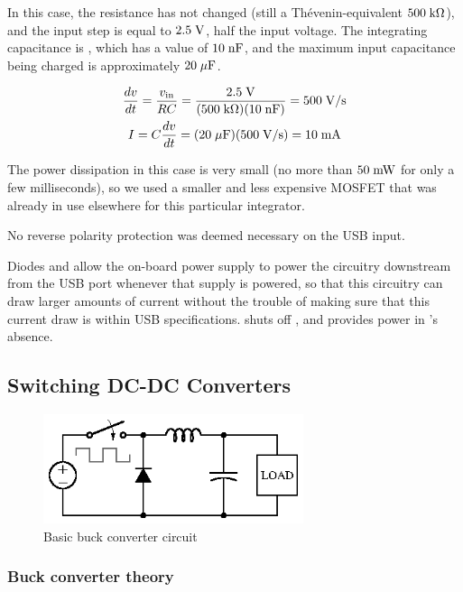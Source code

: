 In this case, the resistance has not changed (still a Th\'evenin-equivalent
$500\;\mathrm{k\Omega}$), and the input step is equal to $2.5\;\mathrm{V}$, half the
input voltage. The integrating capacitance is , which has a value of $10\;\mathrm{nF}$,
and the maximum input capacitance being charged is approximately $20\;\mathrm{\mu F}$.

\begin{gather*}
    \frac{dv}{dt} = \frac{v_{\mathrm{in}}}{RC} = \frac{2.5\;\mathrm{V}}{(500\;\mathrm{k\Omega})(10\;\mathrm{nF})}
    = 500\;\mathrm{V/s} \\
    I = C \frac{dv}{dt} = (20\;\mathrm{\mu F})(500\;\mathrm{V/s}) = 10\;\mathrm{mA}
\end{gather*}

The power dissipation in this case is very small (no more than $50\;\mathrm{mW}$ for
only a few milliseconds), so we used a smaller and less expensive MOSFET that
was already in use elsewhere for this particular integrator.

No reverse polarity protection was deemed necessary on the USB input.

Diodes  and  allow the on-board power supply to power
the circuitry downstream from the USB port whenever that supply is powered,
so that this circuitry can draw larger amounts of current without the trouble
of making sure that this current draw is within USB specifications.
 shuts off , and  provides power in
's absence.


\subsection{Switching DC-DC Converters}

\begin{figure}[H]
\centering
\includegraphics[width=3in]{buckconv}
\caption{Basic buck converter circuit}
\label{fig:basicbuck}
\end{figure}

\subsubsection{Buck converter theory}

